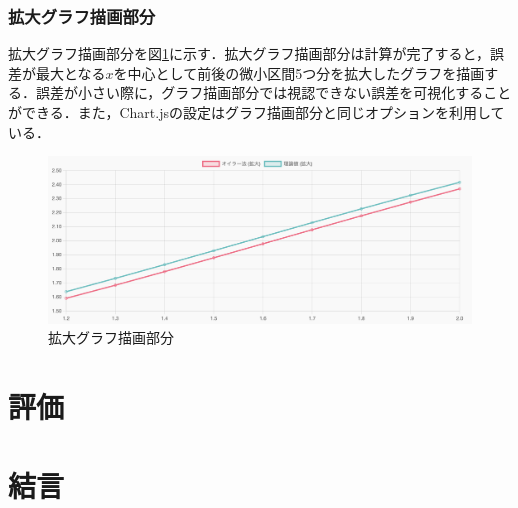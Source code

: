 \documentclass[a4paper, 12pt]{ltjsarticle}
\begin{document}
\clearpage

\subsubsection{拡大グラフ描画部分}
拡大グラフ描画部分を図\ref{fig:拡大グラフ描画部分}に示す．拡大グラフ描画部分は計算が完了すると，誤差が最大となる$x$を中心として前後の微小区間5つ分を拡大したグラフを描画する．誤差が小さい際に，グラフ描画部分では視認できない誤差を可視化することができる．また，Chart.jsの設定はグラフ描画部分と同じオプションを利用している．

\begin{figure}[h]
\begin{center}
\includegraphics[clip,width=\textwidth,keepaspectratio]{sim-kakudai-gurafu.png}
\end{center}
\caption{拡大グラフ描画部分}
\label{fig:拡大グラフ描画部分}
\end{figure}

\section{評価}
\clearpage
\section{結言}
\clearpage

\end{document}
